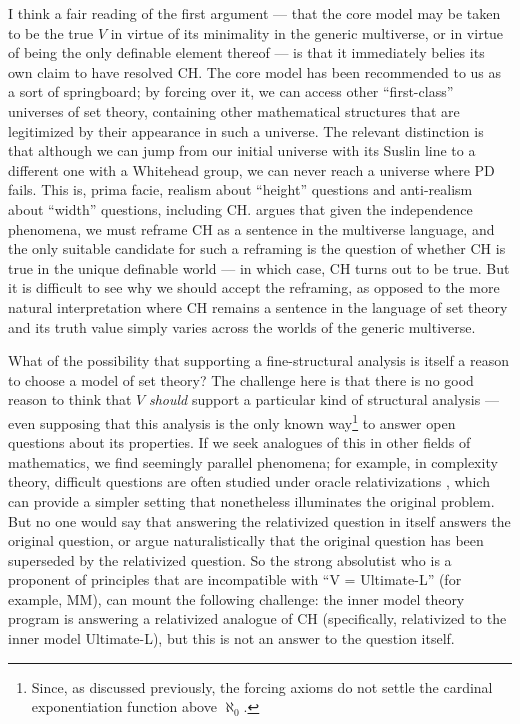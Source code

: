 \documentclass[letterpaper,12pt]{article}
\begin{document}
I think a fair reading of the first argument --- that the core model may be taken to be the true $V$ in virtue of its minimality in the generic multiverse, or in virtue of being the only definable element thereof --- is that it immediately belies its own claim to have resolved CH. The core model has been recommended to us as a sort of springboard; by forcing over it, we can access other ``first-class'' universes of set theory, containing other mathematical structures that are legitimized by their appearance in such a universe. The relevant distinction is that although we can jump from our initial universe with its Suslin line to a different one with a Whitehead group, we can never reach a universe where PD fails. This is, prima facie, realism about ``height'' questions and anti-realism about ``width'' questions, including CH. \cite{steel2012godel} argues that given the independence phenomena, we must reframe CH as a sentence in the multiverse language, and the only suitable candidate for such a reframing is the question of whether CH is true in the unique definable world --- in which case, CH turns out to be true. But it is difficult to see why we should accept the reframing, as opposed to the more natural interpretation where CH remains a sentence in the language of set theory and its truth value simply varies across the worlds of the generic multiverse.

What of the possibility that supporting a fine-structural analysis is itself a reason to choose a model of set theory? The challenge here is that there is no good reason to think that $V$ \emph{should} support a particular kind of structural analysis --- even supposing that this analysis is the only known way\footnote{Since, as discussed previously, the forcing axioms do not settle the cardinal exponentiation function above $\aleph_0$.} to answer open questions about its properties. If we seek analogues of this in other fields of mathematics, we find seemingly parallel phenomena; for example, in complexity theory, difficult questions are often studied under oracle relativizations \citep{fortnow1994role}, which can provide a simpler setting that nonetheless illuminates the original problem. But no one would say that answering the relativized question in itself answers the original question, or argue naturalistically that the original question has been superseded by the relativized question. So the strong absolutist who is a proponent of principles that are incompatible with ``V = Ultimate-L'' (for example, MM), can mount the following challenge: the inner model theory program is answering a relativized analogue of CH (specifically, relativized to the inner model Ultimate-L), but this is not an answer to the question itself.
\end{document}
